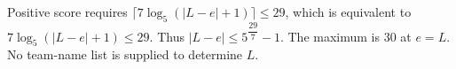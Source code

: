 Positive score requires $\lceil7\log_5(|L-e|+1)\rceil\le29$, which is equivalent to $7\log_5(|L-e|+1)\le29$. Thus $\boxed{|L-e|\le5^{\dfrac{29}{7}}-1}$. The maximum is 30 at $e=L$. No team-name list is supplied to determine $L$.
